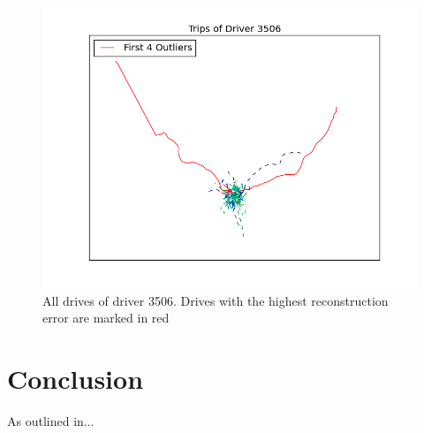 \documentclass{vldb}
\begin{document}
\begin{figure}
\centering
\includegraphics[width=\linewidth]{"pics/outliers_junk/D_3506"}
\caption{All drives of driver 3506. Drives with the highest reconstruction error are marked in red}
\label{fig:driver_3506}
\end{figure}

\section{Conclusion}
\label{sec:Conclusion}
As outlined in...

\end{document}
